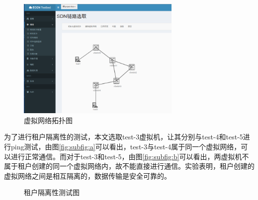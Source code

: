 \begin{figure}[!htb]
  \centering
  \includegraphics[width=0.7\textwidth,height=0.50\textwidth]{logo/virtualnet.png}
  \caption{虚拟网络拓扑图}
  \label{fig:virtualnet}
\end{figure}

为了进行租户隔离性的测试，本文选取test-3虚拟机，让其分别与test-4和test-5进行ping测试，由图\ref{fig:subfig:a}可以看出，test-3与test-4属于同一个虚拟网络，可以进行正常通信。而对于test-3和test-5，由图\ref{fig:subfig:b}可以看出，两虚拟机不属于租户创建的同一个虚拟网络内，故不能直接进行通信。实验表明，租户创建的虚拟网络之间是相互隔离的，数据传输是安全可靠的。

\begin{figure}
 \centering
 \caption{租户隔离性测试图}
 \label{fig:isolation} %
\end{figure}
